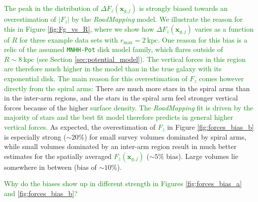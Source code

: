 \documentclass[iop,revtex4,numberedappendix,appendixfloats]{emulateapj}
\newcommand{\vect}[1]{\boldsymbol{#1}}
\newcommand{\RM}{{\sl RoadMapping}}
\newcommand{\NEW}[1]{\textcolor{Green}{#1}}
\newcommand{\OLD}[1]{}
\begin{document}
\NEW{The peak in the distribution of $\Delta F_z(\vect{x}_{g,j})$ is strongly biased towards an overestimation of $|F_{z}|$ by the \RM{} model. We illustrate the reason for this in Figure \ref{fig:Fg_vs_R}, where we show how $\Delta F_z(\vect{x}_{g,j})$ varies as a function of $R$ for three example data sets with $r_\text{max}=2~\text{kpc}$. One reason for this bias is a relic of the assumed \texttt{MNHH-Pot} disk model family, which flares outside of $R\sim8~\text{kpc}$ (see Section \ref{sec:potential_model}). The vertical forces in this region are therefore much higher in the model than in the true galaxy with its exponential disk. The main reason for this overestimation of $F_z$ comes however directly from the spiral arms:} \OLD{The peak of $\Delta F_z(*_i)$ in Figure \ref{fig:forces_bias_a} is approximately at 0, while the peak of $\Delta F_z(g_j)$ is strongly biased towards an overestimation of $|F_{z,M}|$.} There are much more stars in the spiral arms than in the inter-arm regions, and the stars in the spiral arm feel stronger vertical forces because of the higher \OLD{disk mass}\NEW{surface density}. \NEW{The \RM{} fit is driven by the majority of stars and the best fit model therefore predicts in general higher vertical forces.} \OLD{\RM{} finds a model that in general has much stronger vertical forces than expected for a smooth potential. While the actual vertical forces that the many stars in the spiral arms feel are very well recovered, it becomes obvious when looking at the grid points regularly distributed in space that the \RM{} vertical forces are too strong on a spatial average. We illustrate this also in Figure \ref{fig:Fg_vs_z_and_R}: Regions far away from the strongest spiral arms (at large $R$ and large $|z|$, see Figure \ref{fig:simulation}) are not well described by a potential derived mostly from stars in spiral arms.} As expected, the overestimation of \OLD{$|F_{z,T}(g_j)|$}\NEW{$F_{z}$} in Figure \ref{fig:forces_bias_b} is especially strong ($\sim 20 \%$) for small survey volumes dominated by spiral arms, while small volumes dominated by an inter-arm region result in much better estimates for the spatially averaged \OLD{$F_z(g_j)$}\NEW{$F_z(\vect{x}_{g,j})$} ($\sim5\%$ bias). Large volumes lie somewhere in between (bias of $\sim10\%$).

\NEW{Why do the biases show up in different strength in Figures \ref{fig:forces_bias_a} and \ref{fig:forces_bias_b}?}
\end{document}
